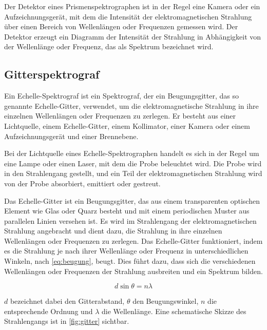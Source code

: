 \documentclass[12pt,english,ngerman]{scrartcl}
\begin{document}
Der Detektor eines Prismenspektrographen ist in der Regel eine Kamera oder ein Aufzeichnungsgerät, mit dem die Intensität 
der elektromagnetischen Strahlung über einen Bereich von Wellenlängen oder Frequenzen gemessen wird. Der Detektor erzeugt 
ein Diagramm der Intensität der Strahlung in Abhängigkeit von der Wellenlänge oder Frequenz, das als Spektrum bezeichnet 
wird.

\subsection{Gitterspektrograf}

Ein Echelle-Spektrograf ist ein Spektrograf, der ein Beugungsgitter, das so genannte Echelle-Gitter, verwendet, um die 
elektromagnetische Strahlung in ihre einzelnen Wellenlängen oder Frequenzen zu zerlegen. Er besteht aus einer Lichtquelle, 
einem Echelle-Gitter, einem Kollimator, einer Kamera oder einem Aufzeichnungsgerät und einer Brennebene.

Bei der Lichtquelle eines Echelle-Spektrographen handelt es sich in der Regel um eine Lampe oder einen Laser, mit dem die 
Probe beleuchtet wird. Die Probe wird in den Strahlengang gestellt, und ein Teil der elektromagnetischen Strahlung wird von 
der Probe absorbiert, emittiert oder gestreut.

Das Echelle-Gitter ist ein Beugungsgitter, das aus einem transparenten optischen Element wie Glas oder Quarz besteht und 
mit einem periodischen Muster aus parallelen Linien versehen ist. Es wird im Strahlengang der elektromagnetischen Strahlung 
angebracht und dient dazu, die Strahlung in ihre einzelnen Wellenlängen oder Frequenzen zu zerlegen. Das Echelle-Gitter 
funktioniert, indem es die Strahlung je nach ihrer Wellenlänge oder Frequenz in unterschiedlichen Winkeln, nach \autoref{eq:beugung},
beugt. Dies führt dazu, dass sich die verschiedenen Wellenlängen oder Frequenzen der Strahlung ausbreiten und ein Spektrum 
bilden.

\begin{equation}
	d \sin{\theta} = n \lambda
	\label{eq:brechung}
\end{equation}

$d$ bezeichnet dabei den Gitterabstand, $\theta$ den Beugungswinkel, $n$ die entsprechende Ordnung und $\lambda$ die Wellenlänge.
Eine schematische Skizze des Strahlengangs ist in \autoref{fig:gitter} sichtbar.
\end{document}

